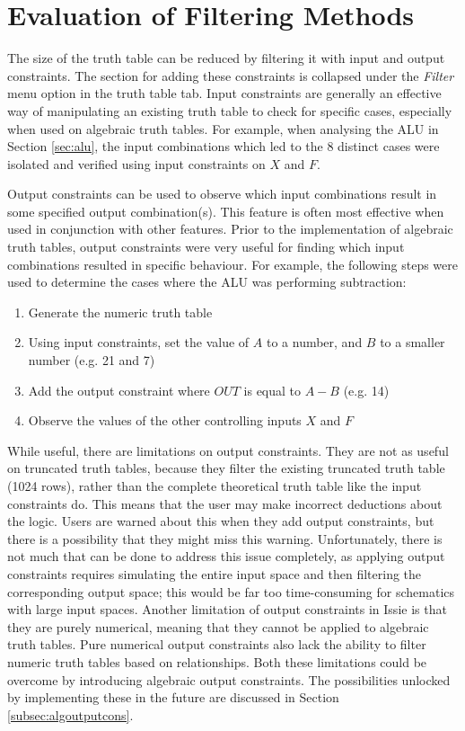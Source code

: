 \section{Evaluation of Filtering Methods}
The size of the truth table can be reduced by filtering it with input and output constraints. The section for adding these constraints is collapsed under the \textit{Filter} menu option in the truth table tab. Input constraints are generally an effective way of manipulating an existing truth table to check for specific cases, especially when used on algebraic truth tables. For example, when analysing the ALU in Section \ref{sec:alu}, the input combinations which led to the 8 distinct cases were isolated and verified using input constraints on $X$ and $F$.

Output constraints can be used to observe which input combinations result in some specified output combination(s). This feature is often most effective when used in conjunction with other features. Prior to the implementation of algebraic truth tables, output constraints were very useful for finding which input combinations resulted in specific behaviour. For example, the following steps were used to determine the cases where the ALU was performing subtraction:
\begin{enumerate}
    \item Generate the numeric truth table
    \item Using input constraints, set the value of $A$ to a number, and $B$ to a smaller number (e.g. 21 and 7)
    \item Add the output constraint where $OUT$ is equal to $A -B$ (e.g. 14)
    \item Observe the values of the other controlling inputs $X$ and $F$
\end{enumerate}
While useful, there are limitations on output constraints. They are not as useful on truncated truth tables, because they filter the existing truncated truth table (1024 rows), rather than the complete theoretical truth table like the input constraints do. This means that the user may make incorrect deductions about the logic. Users are warned about this when they add output constraints, but there is a possibility that they might miss this warning. Unfortunately, there is not much that can be done to address this issue completely, as applying output constraints requires simulating the entire input space and then filtering the corresponding output space; this would be far too time-consuming for schematics with large input spaces. 
Another limitation of output constraints in Issie is that they are purely numerical, meaning that they cannot be applied to algebraic truth tables. Pure numerical output constraints also lack the ability to filter numeric truth tables based on relationships. Both these limitations could be overcome by introducing algebraic output constraints. The possibilities unlocked by implementing these in the future are discussed in Section \ref{subsec:algoutputcons}.

